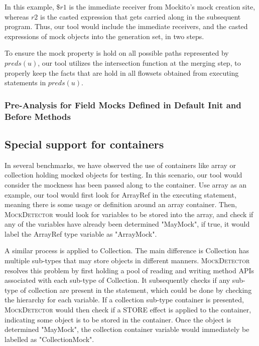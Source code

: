 In this example, $\$r1$ is the immediate receiver from Mockito's mock creation site, whereas $r2$ is the casted expression that gets carried along in the subsequent program. Thus, our tool would include the immediate receivers, and the casted expressions of mock objects into the generation set, in two steps. 

To ensure the mock property is hold on all possible paths represented by $preds(u)$, our tool utilizes the intersection function at the merging step, to properly keep the facts that are hold in all flowsets obtained from executing statements in $preds(u)$.

\subsubsection{Pre-Analysis for Field Mocks Defined in Default Init and Before Methods}
\label{subsubsec:pre-analysis}

\subsection{Special support for containers}
\label{subsec:container}

In several benchmarks, we have observed the use of containers like array or collection holding mocked objects for testing. In this scenario, our tool would consider the mockness has been passed along to the container. Use array as an example, our tool would first look for ArrayRef in the executing statement, meaning there is some usage or definition around an array container. Then, \textsc{MockDetector} would look for variables to be stored into the array, and check if any of the variables have already been determined "MayMock", if true, it would label the ArrayRef type variable as "ArrayMock".

A similar process is applied to Collection. The main difference is Collection has multiple sub-types that may store objects in different manners. \textsc{MockDetector} resolves this problem by first holding a pool of reading and writing method APIs associated with each sub-type of Collection. It subsequently checks if any sub-type of collection are present in the statement, which could be done by checking the hierarchy for each variable. If a collection sub-type container is presented, \textsc{MockDetector} would then check if a STORE effect is applied to the container, indicating some object is to be stored in the container. Once the object is determined "MayMock", the collection container variable would immediately be labelled as "CollectionMock".

